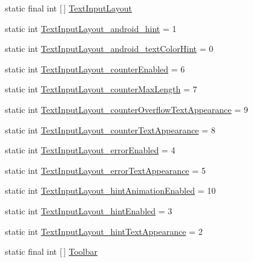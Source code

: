\begin{DoxyCompactItemize}
\item 
static final int \mbox{[}$\,$\mbox{]} \hyperlink{classandroid_1_1support_1_1v4_1_1R_1_1styleable_a86943debf88d7a9dc4c0627a8546913d}{Text\+Input\+Layout}
\item 
static int \hyperlink{classandroid_1_1support_1_1v4_1_1R_1_1styleable_a0337fe9d70637bd62592e7b41ccd5850}{Text\+Input\+Layout\+\_\+android\+\_\+hint} = 1
\item 
static int \hyperlink{classandroid_1_1support_1_1v4_1_1R_1_1styleable_a10cd7921092af5c7b2f2f95b6735bc64}{Text\+Input\+Layout\+\_\+android\+\_\+text\+Color\+Hint} = 0
\item 
static int \hyperlink{classandroid_1_1support_1_1v4_1_1R_1_1styleable_aaf7513c377000dc3bef62cf4084e03c2}{Text\+Input\+Layout\+\_\+counter\+Enabled} = 6
\item 
static int \hyperlink{classandroid_1_1support_1_1v4_1_1R_1_1styleable_a493f8299f04aee557c2fb4f3baaaea72}{Text\+Input\+Layout\+\_\+counter\+Max\+Length} = 7
\item 
static int \hyperlink{classandroid_1_1support_1_1v4_1_1R_1_1styleable_a0d4416285c0952ef775840d271901791}{Text\+Input\+Layout\+\_\+counter\+Overflow\+Text\+Appearance} = 9
\item 
static int \hyperlink{classandroid_1_1support_1_1v4_1_1R_1_1styleable_aeb2a80f0f76cdaa1ff3b2b05d42b6356}{Text\+Input\+Layout\+\_\+counter\+Text\+Appearance} = 8
\item 
static int \hyperlink{classandroid_1_1support_1_1v4_1_1R_1_1styleable_a1524c63d3a980ad9efb17c1c648871c2}{Text\+Input\+Layout\+\_\+error\+Enabled} = 4
\item 
static int \hyperlink{classandroid_1_1support_1_1v4_1_1R_1_1styleable_af9ca4eaf2eb93f555c4c269831af4712}{Text\+Input\+Layout\+\_\+error\+Text\+Appearance} = 5
\item 
static int \hyperlink{classandroid_1_1support_1_1v4_1_1R_1_1styleable_a4c514fcd5878b74c6f2da4d89d933eef}{Text\+Input\+Layout\+\_\+hint\+Animation\+Enabled} = 10
\item 
static int \hyperlink{classandroid_1_1support_1_1v4_1_1R_1_1styleable_a9b9008f58fe52182cb029310ed5338c2}{Text\+Input\+Layout\+\_\+hint\+Enabled} = 3
\item 
static int \hyperlink{classandroid_1_1support_1_1v4_1_1R_1_1styleable_af051809dff99b96f096bb56e82505858}{Text\+Input\+Layout\+\_\+hint\+Text\+Appearance} = 2
\item 
static final int \mbox{[}$\,$\mbox{]} \hyperlink{classandroid_1_1support_1_1v4_1_1R_1_1styleable_a211358a2f951023c7735caea0fb5ae04}{Toolbar}

\end{DoxyCompactItemize}

